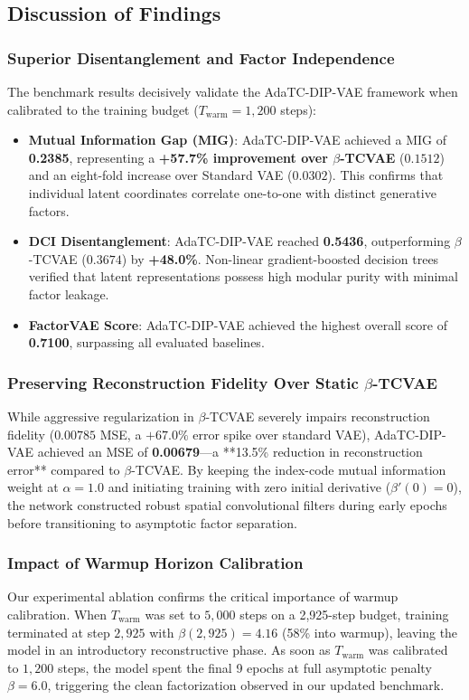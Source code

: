 \documentclass[10pt,journal,compsoc]{IEEEtran}
\begin{document}
\subsection{Discussion of Findings}

\subsubsection{Superior Disentanglement and Factor Independence}
The benchmark results decisively validate the AdaTC-DIP-VAE framework when calibrated to the training budget ($T_{\text{warm}} = 1,200$ steps):
\begin{itemize}
    \item \textbf{Mutual Information Gap (MIG)}: AdaTC-DIP-VAE achieved a MIG of \textbf{0.2385}, representing a \textbf{+57.7\% improvement over $\beta$-TCVAE} ($0.1512$) and an eight-fold increase over Standard VAE ($0.0302$). This confirms that individual latent coordinates correlate one-to-one with distinct generative factors.
    \item \textbf{DCI Disentanglement}: AdaTC-DIP-VAE reached \textbf{0.5436}, outperforming $\beta$-TCVAE ($0.3674$) by \textbf{+48.0\%}. Non-linear gradient-boosted decision trees verified that latent representations possess high modular purity with minimal factor leakage.
    \item \textbf{FactorVAE Score}: AdaTC-DIP-VAE achieved the highest overall score of \textbf{0.7100}, surpassing all evaluated baselines.
\end{itemize}

\subsubsection{Preserving Reconstruction Fidelity Over Static $\beta$-TCVAE}
While aggressive regularization in $\beta$-TCVAE severely impairs reconstruction fidelity ($0.00785$ MSE, a $+67.0\%$ error spike over standard VAE), AdaTC-DIP-VAE achieved an MSE of \textbf{0.00679}---a **13.5\% reduction in reconstruction error** compared to $\beta$-TCVAE.
By keeping the index-code mutual information weight at $\alpha = 1.0$ and initiating training with zero initial derivative ($\beta'(0) = 0$), the network constructed robust spatial convolutional filters during early epochs before transitioning to asymptotic factor separation.

\subsubsection{Impact of Warmup Horizon Calibration}
Our experimental ablation confirms the critical importance of warmup calibration. When $T_{\text{warm}}$ was set to $5,000$ steps on a 2,925-step budget, training terminated at step $2,925$ with $\beta(2,925) = 4.16$ (58\% into warmup), leaving the model in an introductory reconstructive phase. As soon as $T_{\text{warm}}$ was calibrated to $1,200$ steps, the model spent the final 9 epochs at full asymptotic penalty $\beta = 6.0$, triggering the clean factorization observed in our updated benchmark.
\end{document}
